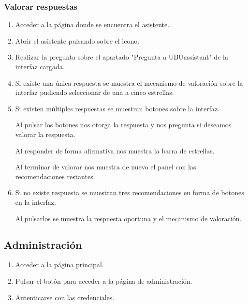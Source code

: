 \subsubsection{Valorar respuestas}

\begin{enumerate}
\item Acceder a la página donde se encuentra el asistente.
\item Abrir el asistente pulsando sobre el icono.
\item Realizar la pregunta sobre el apartado "Pregunta a UBUassistant" de la interfaz cargada.
\item Si existe una única respuesta se muestra el mecanismo de valoración sobre la interfaz pudiendo seleccionar de una a cinco estrellas.
\item Si existen múltiples respuestas se muestran botones sobre la interfaz.

Al pulsar los botones nos otorga la respuesta y nos pregunta si deseamos valorar la respuesta. 


Al responder de forma afirmativa nos muestra la barra de estrellas.


Al terminar de valorar nos muestra de nuevo el panel con las recomendaciones restantes.


\item Si no existe respuesta se muestran tres recomendaciones en forma de botones en la interfaz.

Al pulsarlos se muestra la respuesta oportuna y el mecanismo de valoración.


\end{enumerate}

\subsection{Administración}

\begin{enumerate}
\item Acceder a la página principal.
\item Pulsar el botón para acceder a la página de administración.
\item Autenticarse con las credenciales.
\end{enumerate}

